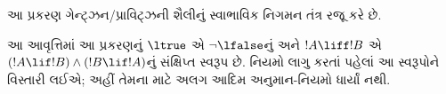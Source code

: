\documentclass[../../../include/open-logic-chapter]{subfiles}
\begin{document}
      {}
      {}

\begin{editorial}
આ પ્રકરણ ગેન્ટ્ઝન/પ્રાવિટ્ઝની શૈલીનું સ્વાભાવિક નિગમન તંત્ર રજૂ કરે છે.

આ આવૃત્તિમાં આ પ્રકરણનું $\ltrue$ એ $\lnot\lfalse$નું અને
$!A\liff!B$ એ $(!A\lif!B)\land(!B\lif!A)$નું સંક્ષિપ્ત સ્વરૂપ છે.
નિયમો લાગુ કરતાં પહેલાં આ સ્વરૂપોને વિસ્તારી લઈએ; અહીં તેમના માટે
અલગ આદિમ અનુમાન-નિયમો ધાર્યાં નથી.
\end{editorial}













\OLEndChapterHook
\end{document}
